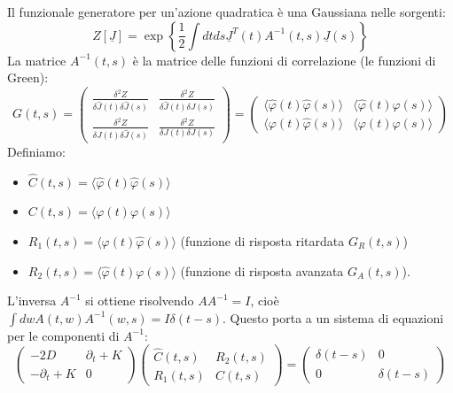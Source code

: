 Il funzionale generatore per un'azione quadratica è una Gaussiana nelle sorgenti:
\begin{equation}
Z[\underline{J}]=\exp\left\{\frac{1}{2}\int dt ds \underline{J}^{T}(t)A^{-1}(t,s)\underline{J}(s)\right\}
\end{equation}
La matrice $A^{-1}(t,s)$ è la matrice delle funzioni di correlazione (le funzioni di Green):
\begin{equation}
G(t,s)=\begin{pmatrix}\frac{\delta^{2}Z}{\delta \hat{J}(t)\delta\hat{J}(s)} & \frac{\delta^{2}Z}{\delta \hat{J}(t)\delta J(s)} \\ \frac{\delta^{2}Z}{\delta J(t)\delta\hat{J}(s)} & \frac{\delta^{2}Z}{\delta J(t)\delta J(s)} \end{pmatrix} =\begin{pmatrix}\langle\hat{\varphi}(t)\hat{\varphi}(s)\rangle & \langle\hat{\varphi}(t)\varphi(s)\rangle\\ \langle\varphi(t)\hat{\varphi}(s)\rangle & \langle\varphi(t)\varphi(s)\rangle\end{pmatrix}
\end{equation}
Definiamo:
\begin{itemize}
    \item $\hat{C}(t,s) = \langle\hat{\varphi}(t)\hat{\varphi}(s)\rangle$
    \item $C(t,s) = \langle\varphi(t)\varphi(s)\rangle$
    \item $R_1(t,s) = \langle\varphi(t)\hat{\varphi}(s)\rangle$ (funzione di risposta ritardata $G_R(t,s)$)
    \item $R_2(t,s) = \langle\hat{\varphi}(t)\varphi(s)\rangle$ (funzione di risposta avanzata $G_A(t,s)$).
\end{itemize}
L'inversa $A^{-1}$ si ottiene risolvendo $A A^{-1} = I$, cioè $\int dw A(t,w)A^{-1}(w,s)=I \delta(t-s)$.
Questo porta a un sistema di equazioni per le componenti di $A^{-1}$:
\begin{equation}
\begin{pmatrix}-2D&\partial_{t}+K\\ -\partial_{t}+K&0\end{pmatrix}\begin{pmatrix}\hat{C}(t,s)&R_{2}(t,s)\\ R_{1}(t,s)&C(t,s)\end{pmatrix}=\begin{pmatrix}\delta(t-s)&0\\ 0&\delta(t-s)\end{pmatrix}
\end{equation}
